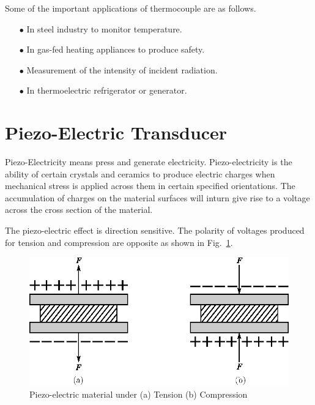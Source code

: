 Some of the important applications of thermocouple are as follows.
\begin{itemize}
\item[$\bullet$] In steel industry to monitor temperature.

\item[$\bullet$] In gas-fed heating appliances to produce safety.

\item[$\bullet$] Measurement of the intensity of incident radiation.

\item[$\bullet$] In thermoelectric refrigerator or generator.
\end{itemize}

\section{Piezo-Electric Transducer}\label{sec8.14}

Piezo-Electricity means press and generate electricity. Piezo-electricity is the ability of certain crystals and ceramics to produce electric charges when mechanical stress is applied across them in certain specified orientations. The accumulation of charges on the material surfaces will inturn give rise to a voltage across the cross section of the material.

\smallskip

The piezo-electric effect is direction sensitive. The polarity of voltages produced for tension and compression are opposite as shown in Fig.~\ref{fig8.22}.

\begin{figure}[H]
\centering
\includegraphics{chap8/fig8.22.eps}
\caption{Piezo-electric material under (a) Tension (b) Compression}\label{fig8.22}
\end{figure}

